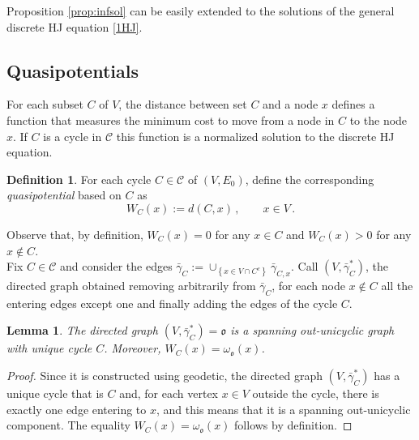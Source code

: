 \documentclass[reqno]{amsart}
\theoremstyle{plain}
\newtheorem{lemma}[theorem]{Lemma}
\theoremstyle{definition}
\newtheorem{definition}[theorem]{Definition}
\theoremstyle{remark}
\numberwithin{equation}{section}
\numberwithin{theorem}{section}
\newcommand{\<}{\langle}
\renewcommand{\>}{\rangle}
\begin{document}
Proposition \ref{prop:infsol} can be easily extended to the solutions of the general discrete HJ equation \eqref{1HJ}.

\subsection{Quasipotentials}

For each subset $C$ of $V$, the distance between set $C$  and a node $x$ defines a function that measures the minimum cost to move from a node in $C$ to the node $x$. If  $C$ is a cycle in $\mathcal{C}$  this function is a normalized solution to the discrete HJ equation.

\begin{definition}
	For each cycle $C\in\mathcal{C}$ of $(V,E_0)$, define the corresponding \emph{quasipotential} based on $C$ as
	\begin{equation}\label{quasiM}
		W_{C}(x):= d(C,x)\,, \qquad x\in V\,.
	\end{equation}
\end{definition}

Observe that, by definition, $W_{C}(x)=0$ for any $x\in C$ and $W_{C}(x)>0$ for any $x\not \in C$. \\

Fix $C\in\mathcal{C}$ and consider the edges $\bar \gamma_{C}:=\cup_{\left\{x\in V\cap C^c\right\}}\bar \gamma_{C,x}$.  Call $(V, \bar\gamma^*_{C})$, the directed graph obtained removing arbitrarily from  $\bar \gamma_{C}$, for each node $x\not\in C$ all the entering edges except one and finally adding the edges of the cycle $C$.

\begin{lemma}\label{lemmaC}
	The directed graph $(V, \bar\gamma^*_{C})=\mathfrak o$ is a spanning out-unicyclic graph with unique cycle $C$. Moreover, $W_C(x)=\omega_{\mathfrak o}(x)$.
\end{lemma}
\begin{proof}
	Since it is constructed using geodetic, the directed graph $(V, \bar\gamma^*_{C})$ has a unique cycle that is $C$ %
	and, for each vertex $x\in V$ outside the cycle, there is exactly one edge entering to $x$, and this means that it is a spanning out-unicyclic component. The equality $W_C(x)=\omega_{\mathfrak o}(x)$ follows by definition.
\end{proof}
\end{document}
